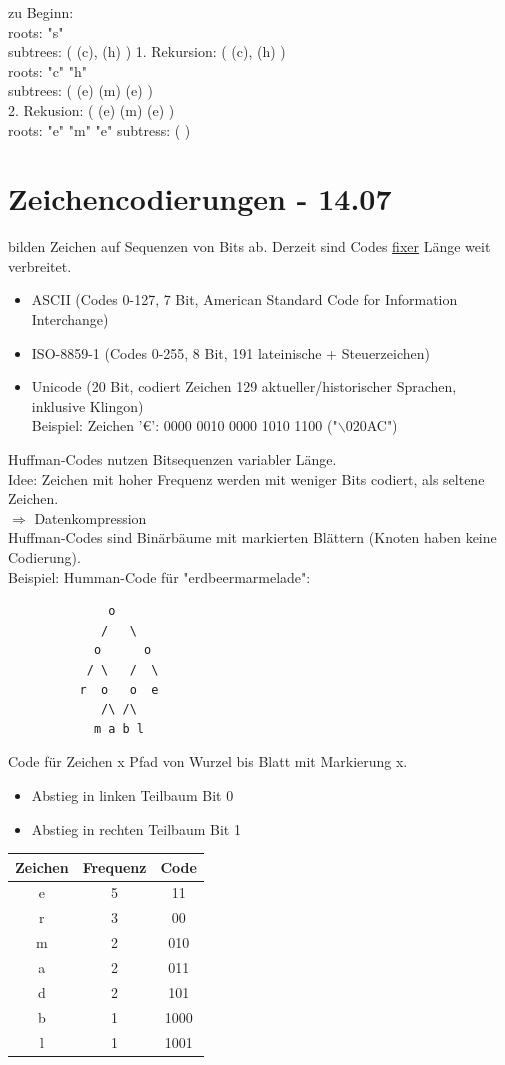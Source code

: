 \documentclass[a4paper, 20pt, openany]{book}
\begin{document}
zu Beginn: \\
roots: "s"\\
subtrees: ( (c), (h) )
1. Rekursion: ( (c), (h) )\\
roots: "c" "h"\\
subtrees: ( (e) (m) (e) )\\
2. Rekusion:  ( (e) (m) (e) )\\
roots: "e" "m" "e"
subtress: ( )

\chapter{Zeichencodierungen - 14.07}
bilden Zeichen auf Sequenzen von Bits ab. Derzeit sind Codes \underline{fixer} Länge weit verbreitet.
\begin{itemize}
\item ASCII (Codes 0-127, 7 Bit, American Standard Code for Information Interchange)
\item ISO-8859-1 (Codes 0-255, 8 Bit, 191 lateinische + Steuerzeichen)
\item Unicode (20 Bit, codiert Zeichen 129 aktueller/historischer Sprachen, inklusive Klingon)\\
Beispiel: Zeichen '€': 0000 0010 0000 1010 1100 ("$\backslash$020AC")
\end{itemize}
Huffman-Codes nutzen Bitsequenzen variabler Länge.\\
Idee: Zeichen mit hoher Frequenz werden mit weniger Bits codiert, als seltene Zeichen.\\
$\Rightarrow$ Datenkompression\\
Huffman-Codes sind Binärbäume mit markierten Blättern (Knoten haben keine Codierung). \\
Beispiel: Humman-Code für "erdbeermarmelade":
\begin{lstlisting}
              o
             /   \
            o      o
           / \   /  \
          r  o   o  e
             /\ /\
            m a b l 
\end{lstlisting}
Code für Zeichen x Pfad von Wurzel bis Blatt mit Markierung x.
\begin{itemize}
\item Abstieg in linken Teilbaum Bit 0
\item Abstieg in rechten Teilbaum Bit 1
\end{itemize}

\begin{tabular}{|c|c|c|}
\hline 
Zeichen & Frequenz & Code \\ 
\hline 
e & 5 & 11 \\ 
\hline 
r & 3 & 00 \\ 
\hline 
m & 2 & 010 \\ 
\hline 
a & 2 & 011 \\ 
\hline 
d & 2 & 101 \\ 
\hline 
b & 1 & 1000 \\ 
\hline 
l & 1 & 1001 \\ 
\hline 
\end{tabular} \\
\pagebreak
\end{document}
